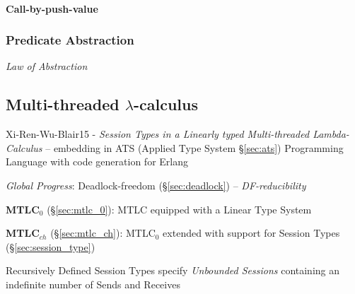 \paragraph{Call-by-push-value}\label{sec:call_by_pushvalue}\hfill



\subsubsection{Predicate Abstraction}\label{sec:predicate_abstraction}

\emph{Law of Abstraction}



\subsection{Multi-threaded $\lambda$-calculus}\label{sec:mtlc}

\begingroup

\newcommand{\chpos}{\mathbf{chpos}}
\newcommand{\chneg}{\mathbf{chneg}}
\newcommand{\channelsend}{\mono{channel\_send}}
\newcommand{\chanpossend}{\mono{chanpos\_send}}
\newcommand{\channegsend}{\mono{channeg\_send}}
\newcommand{\channelrecv}{\mono{channel\_recv}}
\newcommand{\chanposrecv}{\mono{chanpos\_recv}}
\newcommand{\channegrecv}{\mono{channeg\_recv}}
\newcommand{\channelclose}{\mono{channel\_close}}
\newcommand{\chanposclose}{\mono{chanpos\_close}}
\newcommand{\channegclose}{\mono{channeg\_close}}
\newcommand{\Send}{\mathsf{Send}}
\newcommand{\Recv}{\mathsf{Recv}}
\renewcommand{\Unit}{\mathsf{\mathbf{1}}}

Xi-Ren-Wu-Blair15 - \emph{Session Types in a Linearly typed
  Multi-threaded Lambda-Calculus} -- embedding in ATS (Applied Type
System \S\ref{sec:ats}) Programming Language with code generation for
Erlang

\emph{Global Progress}: Deadlock-freedom (\S\ref{sec:deadlock}) --
\emph{DF-reducibility}

\fist \textbf{MTLC$_0$} (\S\ref{sec:mtlc_0}): MTLC equipped with a
Linear Type System

\fist \textbf{MTLC$_{ch}$} (\S\ref{sec:mtlc_ch}): MTLC$_0$ extended
with support for Session Types (\S\ref{sec:session_type})

Recursively Defined Session Types specify \emph{Unbounded Sessions}
containing an indefinite number of Sends and Receives


